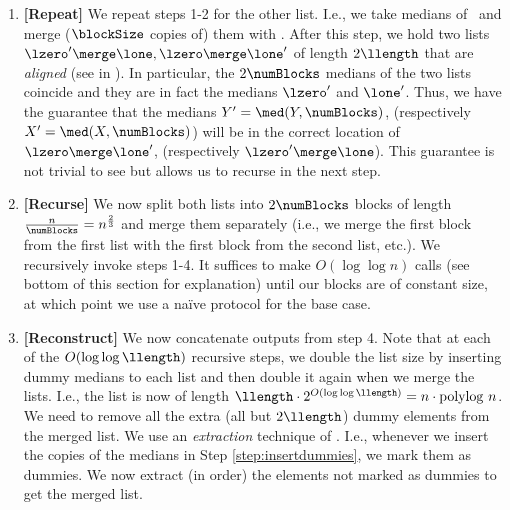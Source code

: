 \begin{enumerate}

\item \textbf{[Repeat]} We repeat steps 1-2 for the other list. I.e., we take medians of \Y\ and  merge ($\blockSize$ copies of) them with \X. After this step, we hold two lists $\lzero' \merge \lone,\lzero \merge \lone'$ of length $2\llength$ that are \emph{aligned} (see  in ). In particular, the $2\numBlocks$ medians of the two lists coincide and they are in fact the medians $\lzero'$ and $\lone'$. Thus, we have the guarantee that the medians $Y'=\med(Y, \numBlocks)$, (respectively $ X'=\med(X, \numBlocks)$) will be in the correct location of $\lzero \merge \lone'$, (respectively $\lzero' \merge \lone$). This guarantee is not trivial to see but allows us to recurse in the next step.

\item \textbf{[Recurse]} We now split both lists into 
$2\numBlocks$
blocks of length $\frac{n}{\numBlocks} = n^{\frac{2}{3}}$ and merge them separately (i.e., we merge the first block from the first list with the first block from the second list, etc.). We recursively invoke steps 1-4. It suffices to make $O(\log\log n)$ calls (see bottom of this section for explanation) until our blocks are of constant size, at which point we use a na\"ive protocol for the base case.

\item \textbf{[Reconstruct]} We now concatenate outputs from step 4. Note that at each of the $O(\log\log\llength)$ recursive steps, we double the list size by inserting dummy medians to each list and then double it again when we merge the lists. I.e., the list is now of length $\llength\cdot 2^{O(\log\log \llength)} = n \cdot \mathrm{polylog}\ n$. We need to remove all the extra (all but $2\llength$) dummy elements from the merged list. We use an \emph{extraction} technique of \cite{EPRINT:PRRS23,EPRINT:BBDLO22}. I.e., whenever we insert the copies of the medians in Step \ref{step:insertdummies}, we mark them as dummies. We now extract (in order) the elements not marked as dummies to get the merged list. 

\end{enumerate}

